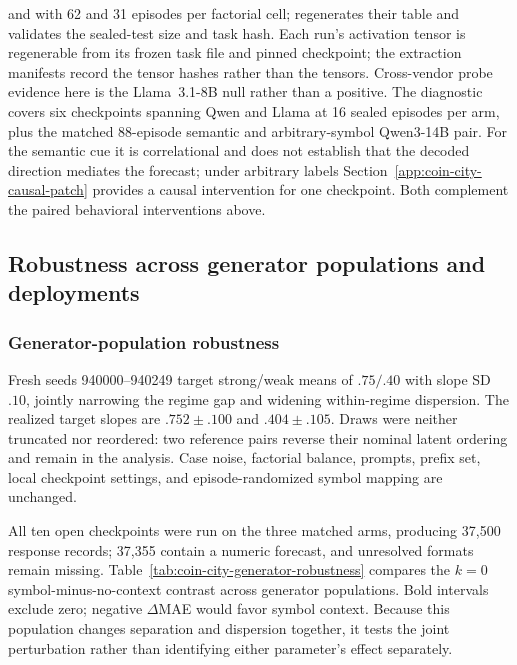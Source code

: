  and
 with 62 and 31 episodes per factorial
cell;  regenerates their table
and validates the sealed-test size and task hash. Each run's
activation tensor is regenerable from its frozen task file and pinned checkpoint;
the extraction manifests record the tensor hashes rather than the tensors.
Cross-vendor probe evidence here is the Llama~3.1-8B null rather than a
positive. The diagnostic covers six checkpoints spanning Qwen and Llama at 16 sealed episodes per arm, plus
the matched 88-episode semantic and arbitrary-symbol Qwen3-14B pair. For the semantic
cue it is correlational and does not establish that the decoded direction
mediates the forecast; under arbitrary labels
Section~\ref{app:coin-city-causal-patch} provides a causal intervention for one
checkpoint. Both complement the paired behavioral interventions above.

\subsection{Robustness across generator populations and deployments}
\label{app:coin-city-robustness}

\subsubsection{Generator-population robustness}
Fresh seeds 940000--940249 target strong/weak means of \(.75/.40\)
with slope SD \(.10\), jointly narrowing the regime gap and widening
within-regime dispersion. The realized target slopes are
\(.752\pm.100\) and \(.404\pm.105\). Draws were neither truncated nor reordered:
two reference pairs reverse their nominal latent ordering and remain in the
analysis. Case noise, factorial balance, prompts, prefix set, local checkpoint
settings, and episode-randomized symbol mapping are unchanged.

All ten open checkpoints were run on the three matched arms, producing 37,500
response records; 37,355 contain a numeric forecast, and unresolved formats remain
missing. Table~\ref{tab:coin-city-generator-robustness} compares the
\(k=0\) symbol-minus-no-context contrast across generator populations. Bold
intervals exclude zero; negative \(\Delta\)MAE would favor symbol context.
Because this population changes separation and dispersion together, it tests the
joint perturbation rather than identifying either parameter's effect separately.


